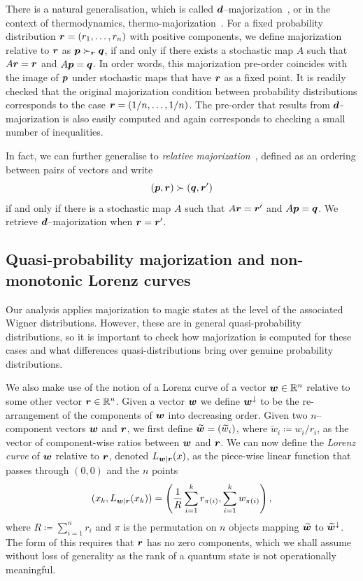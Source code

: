 \documentclass[pra,
aps,
twocolumn,
superscriptaddress,
groupedaddress,
nofootinbib,
reprint
]{revtex4-1}
\begin{document}
There is a natural generalisation, which is called $\bm{d}$--majorization~\cite{Veinott_1971}, or in the context of thermodynamics, thermo-majorization~\cite{cit:horodecki2013}. For a fixed probability distribution $\boldsymbol{r} = (r_1, \dots, r_n)$ with positive components, we define majorization relative to $\boldsymbol{r}$ as $\boldsymbol{p} \succ_{\boldsymbol{r}} \boldsymbol{q}$, if and only if there exists a stochastic map $A$ such that $A\boldsymbol{r} = \boldsymbol{r}$ and $A \boldsymbol{p} = \boldsymbol{q}$. In order words, this majorization pre-order coincides with the image of $\boldsymbol{p}$ under stochastic maps that have $\boldsymbol{r}$ as a fixed point. It is readily checked that the original majorization condition between probability distributions corresponds to the case $\boldsymbol{r} = (1/n, \dots, 1/n)$. The pre-order that results from $\bm{d}$-majorization is also easily computed and again corresponds to checking a small number of inequalities.

In fact, we can further generalise to \emph{relative majorization}~\cite{Blackwell_1953, Ruch_1976, ruch_mixing_1978, Renes_2016, Buscemi_2017, Rethinasamy_2020}, defined as an ordering between pairs of vectors and write 
\begin{equation}
	(\boldsymbol{p},\boldsymbol{r}) \succ (\boldsymbol{q}, \boldsymbol{r}')
\end{equation}
if and only if there is a stochastic map $A$ such that $A\boldsymbol{r} = \boldsymbol{r}'$ and $A\boldsymbol{p} = \boldsymbol{q}$. We retrieve $\bm{d}$--majorization when $\boldsymbol{r} = \boldsymbol{r}'$.

\subsection{Quasi-probability majorization and non-monotonic Lorenz curves}
\label{sec:lc}

Our analysis applies majorization to magic states at the level of the associated Wigner distributions. However, these are in general quasi-probability distributions, so it is important to check how majorization is computed for these cases and what differences quasi-distributions bring over genuine probability distributions.

We also make use of the notion of a Lorenz curve of a vector $\boldsymbol{w} \in \mathbb{R}^n$ relative to some other vector $\boldsymbol{r} \in \mathbb{R}^n$. Given a vector $\boldsymbol{w}$ we define $\boldsymbol{w}^\downarrow$ to be the re-arrangement of the components of $\boldsymbol{w}$ into decreasing order. Given two $n$--component vectors $\boldsymbol{w}$ and $\boldsymbol{r}$, we first define $\widetilde{\boldsymbol{w}}=(\widetilde{w}_i)$, where $\widetilde{w}_i \coloneqq w_i/r_i$, as the vector of component-wise ratios between $\boldsymbol{w}$ and $\boldsymbol{r}$.
We can now define the \emph{Lorenz curve} of $\boldsymbol{w}$ relative to $\boldsymbol{r}$, denoted $L_{\boldsymbol{w}|\boldsymbol{r}}(x)$, as the piece-wise linear function that passes through $(0,0)$ and the $n$ points
\begin{equation}
\label{eq:lc}
        (x_k,L_{\boldsymbol{w}|\boldsymbol{r}}(x_k)) =\left( \frac{1}{R}\sum_{i=1}^k r_{\pi(i)}, \sum_{i=1}^k w_{\pi(i)} \right),
\end{equation}
where $R\coloneqq \sum_{i=1}^n r_i$ and $\pi$ is the permutation on $n$ objects mapping $\widetilde{\boldsymbol{w}}$ to $\widetilde{\boldsymbol{w}}^{\downarrow}$. The form of this requires that $\boldsymbol{r}$ has no zero components, which we shall assume without loss of generality as the rank of a quantum state is not operationally meaningful.
\end{document}
